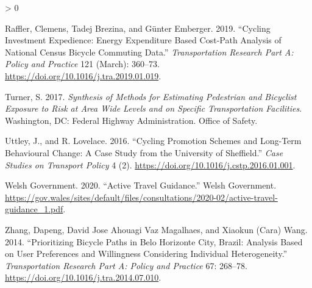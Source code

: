 \documentclass[galley]{jtlu-article-2col}
\newlength{\cslhangindent}
\newenvironment{CSLReferences}[2] %
 {%
  \setlength{\parindent}{0pt}
  \ifodd #1 \everypar{\setlength{\hangindent}{\cslhangindent}}\ignorespaces\fi
  \ifnum #2 > 0
  \setlength{\parskip}{#2\baselineskip}
  \fi
 }%
 {}
\begin{document}
\begin{CSLReferences}{1}{0}
\leavevmode\hypertarget{ref-raffler_cycling_2019}{}%
Raffler, Clemens, Tadej Brezina, and Günter Emberger. 2019. {``Cycling Investment Expedience: {Energy} Expenditure Based {Cost}-{Path Analysis} of National Census Bicycle Commuting Data.''} \emph{Transportation Research Part A: Policy and Practice} 121 (March): 360--73. \url{https://doi.org/10.1016/j.tra.2019.01.019}.

\leavevmode\hypertarget{ref-turner_synthesis_2017}{}%
Turner, S. 2017. \emph{Synthesis of Methods for Estimating Pedestrian and Bicyclist Exposure to Risk at Area Wide Levels and on Specific Transportation Facilities}. {Washington, DC}: {Federal Highway Administration. Office of Safety}.

\leavevmode\hypertarget{ref-uttley_cycling_2016}{}%
Uttley, J., and R. Lovelace. 2016. {``Cycling Promotion Schemes and Long-Term Behavioural Change: {A} Case Study from the {University} of {Sheffield}.''} \emph{Case Studies on Transport Policy} 4 (2). \url{https://doi.org/10.1016/j.cstp.2016.01.001}.

\leavevmode\hypertarget{ref-welshgovernment_active_2020}{}%
Welsh Government. 2020. {``Active {Travel Guidance}.''} {Welsh Government}. \url{https://gov.wales/sites/default/files/consultations/2020-02/active-travel-guidance_1.pdf}.

\leavevmode\hypertarget{ref-zhang_prioritizing_2014}{}%
Zhang, Dapeng, David Jose Ahouagi Vaz Magalhaes, and Xiaokun (Cara) Wang. 2014. {``Prioritizing Bicycle Paths in {Belo Horizonte City}, {Brazil}: {Analysis} Based on User Preferences and Willingness Considering Individual Heterogeneity.''} \emph{Transportation Research Part A: Policy and Practice} 67: 268--78. \url{https://doi.org/10.1016/j.tra.2014.07.010}.

\end{CSLReferences}

%
%
%
%
%
%
%
%







\end{document}
